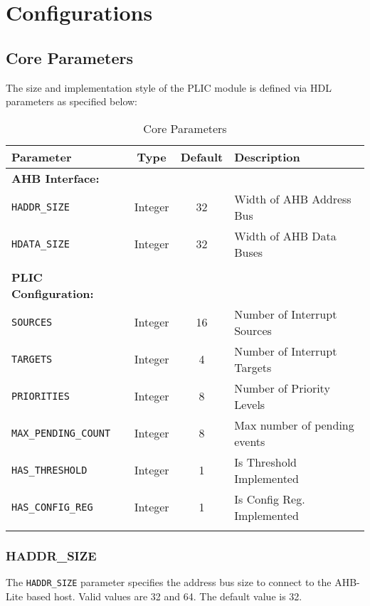 \section{Configurations}

\hypertarget{core-parameters}{\subsection{Core Parameters}\label{sec:core-parameters}}

The size and implementation style of the PLIC module is defined via HDL
parameters as specified below:


\begin{table}[h]
	\begin{tabular*}{0.9\textwidth}{@{\extracolsep{\fill}}lccl}	
		\thickhline 
		\textbf{Parameter} & \textbf{Type} & \textbf{Default} & \textbf{Description}\\
		\hline
		\textbf{AHB Interface:} & & &\\
		\texttt{HADDR\_SIZE} & Integer & 32 & Width of AHB Address Bus\\
		\texttt{HDATA\_SIZE} & Integer & 32 & Width of AHB Data Buses\\
		& & &\\
		\textbf{PLIC Configuration:} & & &\\
		\texttt{SOURCES} & Integer & 16 & Number of Interrupt Sources\\
		\texttt{TARGETS} & Integer & 4 & Number of Interrupt Targets\\
		\texttt{PRIORITIES} & Integer & 8 & Number of Priority Levels\\
		\texttt{MAX\_PENDING\_COUNT} & Integer & 8 & Max number of pending events\\
		\texttt{HAS\_THRESHOLD} & Integer & 1 & Is Threshold Implemented\\
		\texttt{HAS\_CONFIG\_REG} & Integer & 1 & Is Config Reg. Implemented\\
		\thickhline 	
	\end{tabular*} 
	\caption{Core Parameters}
	\label{tab:CoreParams}
\end{table}


\subsubsection{HADDR\_SIZE}

The \texttt{HADDR\_SIZE} parameter specifies the address bus size to
connect to the AHB-Lite based host. Valid values are 32 and 64. The
default value is 32.

